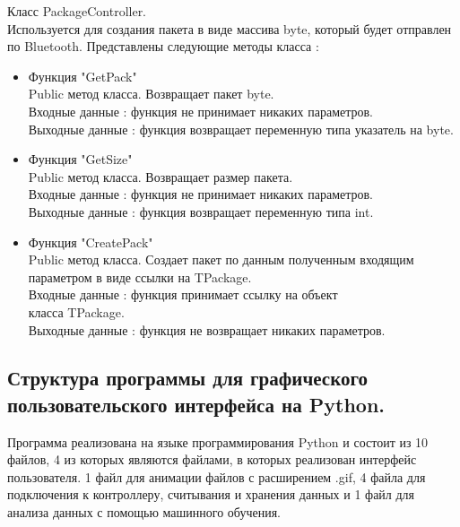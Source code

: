 \documentclass[a4document]{article}
\begin{document}
{\begin{itemize}
        \newpage
        Класс PackageController. \\
        Используется для создания пакета в виде массива byte, который будет отправлен по Bluetooth.
        Представлены следующие методы класса : 
            \begin{itemize}
                \item Функция "GetPack" \\
                    Public метод класса. Возвращает пакет byte. \\
                    Входные данные : функция не принимает никаких параметров. \\
                    Выходные данные : функция возвращает переменную типа указатель на byte.
                \item Функция "GetSize" \\
                    Public метод класса. Возвращает размер пакета. \\
                    Входные данные : функция не принимает никаких параметров. \\
                    Выходные данные : функция возвращает переменную типа int.
                \item Функция "CreatePack" \\
                    Public метод класса. Создает пакет по данным полученным входящим параметром в виде ссылки на TPackage.\\
                    Входные данные : функция принимает ссылку на объект\\ класса TPackage.\\
                    Выходные данные : функция не возвращает никаких параметров.
            \end{itemize}

        
    
\end{itemize}

\newpage

\subsection*{Структура программы для графического пользовательского интерфейса на Python.}
Программа реализована на языке программирования Python и состоит из 10 файлов, 4 из которых являются файлами, в которых реализован интерфейс 
пользователя. 1 файл для анимации файлов с расширением .gif, 4 файла для подключения к контроллеру, считывания и хранения данных и 1 файл
для анализа данных с помощью машинного обучения.


}
\end{document}
